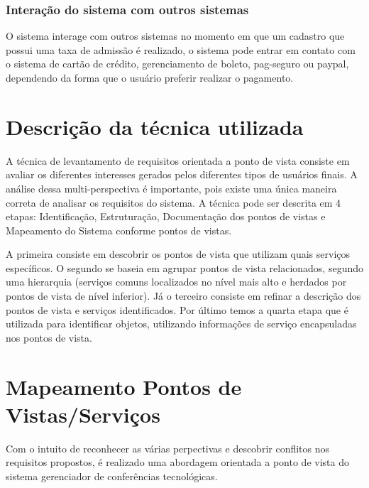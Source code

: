 \documentclass[letter]{article}
\begin{document}
\subsubsection{Interação do sistema com outros sistemas}

O sistema interage com outros sistemas no momento em que um cadastro que possui uma taxa de admissão é realizado, o sistema pode entrar em contato com o sistema de cartão de crédito, gerenciamento de boleto, pag-seguro ou paypal, dependendo da forma que o usuário preferir realizar o pagamento.



\section{Descrição da técnica utilizada}

A técnica de levantamento de requisitos orientada a ponto de vista consiste em avaliar os diferentes interesses gerados pelos diferentes tipos de usuários finais. A análise dessa multi-perspectiva é importante, pois existe uma única maneira correta de analisar os requisitos do sistema. A técnica pode ser descrita em 4 etapas: Identificação, Estruturação, Documentação dos pontos de vistas e Mapeamento do Sistema conforme pontos de vistas.

A primeira consiste em descobrir os pontos de vista que utilizam quais serviços específicos. O segundo se baseia em agrupar pontos de vista relacionados, segundo uma hierarquia (serviços comuns localizados no nível mais alto e herdados por pontos de vista de nível inferior). Já o terceiro consiste em refinar a descrição dos pontos de vista e serviços identificados. Por último temos a quarta etapa que é utilizada para identificar objetos, utilizando informações de serviço encapsuladas nos pontos de vista.





\section{Mapeamento Pontos de Vistas/Serviços}

Com o intuito de reconhecer as várias perpectivas e descobrir conflitos nos requisitos propostos, é realizado uma abordagem orientada a ponto de vista do sistema gerenciador de conferências tecnológicas.
\end{document}
